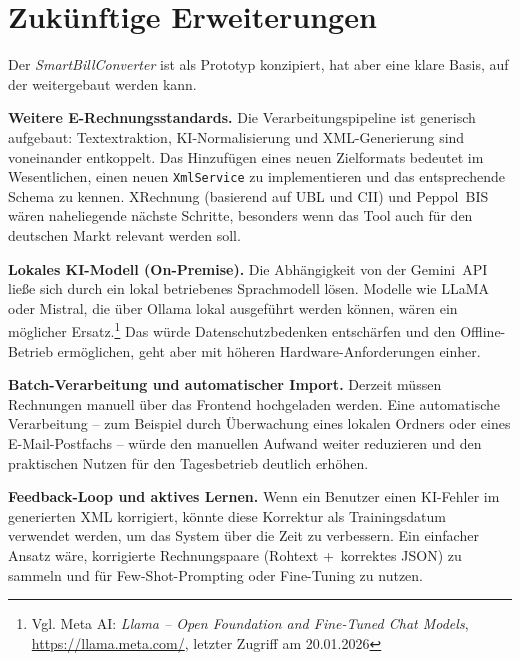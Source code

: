 \section{Zukünftige Erweiterungen}
Der \textit{SmartBillConverter} ist als Prototyp konzipiert, hat aber eine klare
Basis, auf der weitergebaut werden kann.

\textbf{Weitere E-Rechnungsstandards.}
Die Verarbeitungspipeline ist generisch aufgebaut: Textextraktion,
KI-Normalisierung und XML-Generierung sind voneinander entkoppelt.
Das Hinzufügen eines neuen Zielformats bedeutet im Wesentlichen,
einen neuen \texttt{XmlService} zu implementieren und das entsprechende
Schema zu kennen. XRechnung (basierend auf UBL und CII) und Peppol~BIS
wären naheliegende nächste Schritte, besonders wenn das Tool auch für
den deutschen Markt relevant werden soll.

\textbf{Lokales KI-Modell (On-Premise).}
Die Abhängigkeit von der Gemini~API ließe sich durch ein lokal betriebenes
Sprachmodell lösen. Modelle wie LLaMA oder Mistral, die über Ollama lokal
ausgeführt werden können, wären ein möglicher Ersatz.\footnote{Vgl. Meta AI: \textit{Llama -- Open Foundation and Fine-Tuned Chat Models}, \url{https://llama.meta.com/}, letzter Zugriff am 20.01.2026}
Das würde Datenschutzbedenken entschärfen und den Offline-Betrieb ermöglichen,
geht aber mit höheren Hardware-Anforderungen einher.

\textbf{Batch-Verarbeitung und automatischer Import.}
Derzeit müssen Rechnungen manuell über das Frontend hochgeladen werden.
Eine automatische Verarbeitung -- zum Beispiel durch Überwachung eines lokalen
Ordners oder eines E-Mail-Postfachs -- würde den manuellen Aufwand weiter
reduzieren und den praktischen Nutzen für den Tagesbetrieb deutlich erhöhen.

\textbf{Feedback-Loop und aktives Lernen.}
Wenn ein Benutzer einen KI-Fehler im generierten XML korrigiert, könnte
diese Korrektur als Trainingsdatum verwendet werden, um das System über
die Zeit zu verbessern. Ein einfacher Ansatz wäre, korrigierte Rechnungspaare
(Rohtext +\ korrektes JSON) zu sammeln und für Few-Shot-Prompting oder
Fine-Tuning zu nutzen.
